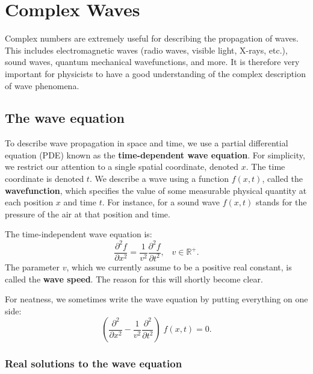 \documentclass[10pt,a4paper]{article}
\begin{document}
\setcounter{page}{38}

\section{Complex Waves}\label{complex-waves}

Complex numbers are extremely useful for describing the propagation of
waves. This includes electromagnetic waves (radio waves, visible light,
X-rays, etc.), sound waves, quantum mechanical wavefunctions, and more.
It is therefore very important for physicists to have a good
understanding of the complex description of wave phenomena.

\subsection{The wave equation}\label{the-wave-equation}

To describe wave propagation in space and time, we use a partial
differential equation (PDE) known as the \textbf{time-dependent wave
  equation}. For simplicity, we restrict our attention to a single
spatial coordinate, denoted $x$.  The time coordinate is denoted
$t$. We describe a wave using a function $f(x,t)$, called the
\textbf{wavefunction}, which specifies the value of some measurable
physical quantity at each position $x$ and time $t$. For instance, for
a sound wave $f(x,t)$ stands for the pressure of the air at that
position and time.

The time-independent wave equation is:
\begin{equation}
\frac{\partial^2 f}{\partial x^2} = \frac{1}{v^2} \frac{\partial^2 f}{\partial t^2}, \;\;\; v \in\mathbb{R}^+.
\end{equation}
The parameter $v$, which we currently assume to be a positive real
constant, is called the \textbf{wave speed}. The reason for this will
shortly become clear.

For neatness, we sometimes write the wave equation by putting everything
on one side:
\begin{equation}
\left(\frac{\partial^2}{\partial x^2} - \frac{1}{v^2} \frac{\partial^2}{\partial t^2}\right) \; f(x,t) = 0.
\end{equation}

\subsubsection{Real solutions to the wave equation}
\label{real-solutions-to-the-wave-equation}
\end{document}
